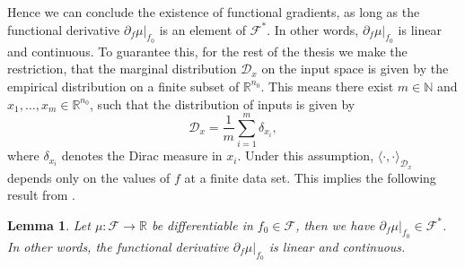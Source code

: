 \documentclass[11pt, a4paper]{article}
\newtheorem{lemma}[theorem]{Lemma}
\newcommand{\N}{\mathbb{N}}
\newcommand{\R}{\mathbb{R}}
\newcommand{\D}{\mathcal{D}}
\newcommand{\F}{\mathcal{F}}
\begin{document}
Hence we can conclude the existence of functional gradients, as long as the functional derivative $\partial_f \mu |_{f_0}$ is an element of $\F^*$. In other words, $\partial_f \mu |_{f_0}$ is linear and continuous. To guarantee this, for the rest of the thesis we make the restriction, that the marginal distribution $\D_x$ on the input space is given by the empirical distribution on a finite subset of $\R^{n_0}$. This means there exist $m \in \N$ and $x_1, \dots, x_m \in \R^{n_0}$, such that the distribution of inputs is given by
\[ \D_x = \frac{1}{m} \sum_{i=1}^{m} \delta_{x_i}, \]
where $\delta_{x_i}$ denotes the Dirac measure in $x_i$. Under this assumption, $\langle \cdot, \cdot \rangle_{\D_x}$ depends only on the values of $f$ at a finite data set. This implies the following result from \cite{NTK}.

\begin{lemma} \label{lem:funcDerivative}
Let $\mu: \F \to \R$ be differentiable in $f_0 \in \F$, then we have $\partial_f\mu |_{f_0} \in \F^*$. In other words, the functional derivative $\partial_f\mu |_{f_0}$ is linear and continuous.
\end{lemma}
\end{document}
